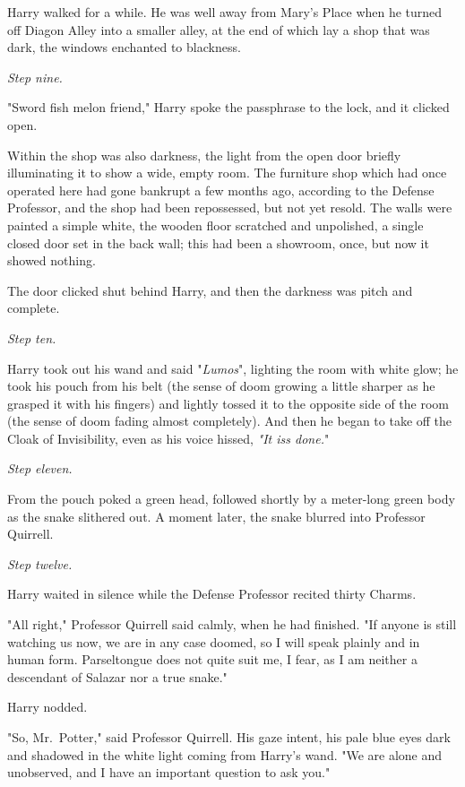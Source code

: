 Harry walked for a while. He was well away from Mary's Place when he turned off 
Diagon Alley into a smaller alley, at the end of which lay a shop that was 
dark, the windows enchanted to blackness.

\emph{Step nine.}

"Sword fish melon friend," Harry spoke the passphrase to the lock, and it 
clicked open.

Within the shop was also darkness, the light from the open door briefly 
illuminating it to show a wide, empty room. The furniture shop which had once 
operated here had gone bankrupt a few months ago, according to the Defense 
Professor, and the shop had been repossessed, but not yet resold. The walls 
were painted a simple white, the wooden floor scratched and unpolished, a 
single closed door set in the back wall; this had been a showroom, once, but 
now it showed nothing.

The door clicked shut behind Harry, and then the darkness was pitch and 
complete.

\emph{Step ten.}

Harry took out his wand and said "\emph{Lumos}", lighting the room with white 
glow; he took his pouch from his belt (the sense of doom growing a little 
sharper as he grasped it with his fingers) and lightly tossed it to the 
opposite side of the room (the sense of doom fading almost completely). And 
then he began to take off the Cloak of Invisibility, even as his voice hissed, 
\emph{"It iss done.}"

\emph{Step eleven.}

From the pouch poked a green head, followed shortly by a meter-long green body 
as the snake slithered out. A moment later, the snake blurred into Professor 
Quirrell.

\emph{Step twelve.}

Harry waited in silence while the Defense Professor recited thirty Charms.

"All right," Professor Quirrell said calmly, when he had finished. "If anyone 
is still watching us now, we are in any case doomed, so I will speak plainly 
and in human form. Parseltongue does not quite suit me, I fear, as I am neither 
a descendant of Salazar nor a true snake."

Harry nodded.

"So, Mr.~Potter," said Professor Quirrell. His gaze intent, his pale blue eyes 
dark and shadowed in the white light coming from Harry's wand. "We are alone 
and unobserved, and I have an important question to ask you."

